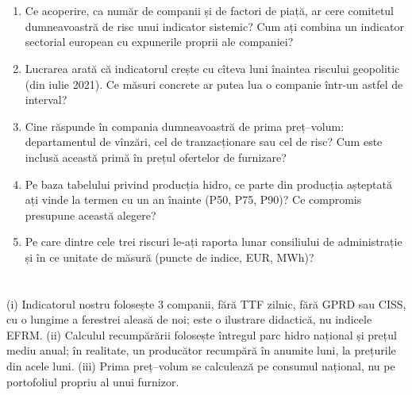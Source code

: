 \section{}
\begin{enumerate}
\item {}%
{Ce acoperire, ca număr de companii și de factori de piață, ar cere comitetul dumneavoastră de risc unui indicator sistemic? Cum ați combina un indicator sectorial european cu expunerile proprii ale companiei?}
\item {}%
{Lucrarea arată că indicatorul crește cu cîteva luni înaintea riscului geopolitic (din iulie 2021). Ce măsuri concrete ar putea lua o companie într-un astfel de interval?}
\item {}%
{Cine răspunde în compania dumneavoastră de prima preț--volum: departamentul de vînzări, cel de tranzacționare sau cel de risc? Cum este inclusă această primă în prețul ofertelor de furnizare?}
\item {}%
{Pe baza tabelului privind producția hidro, ce parte din producția așteptată ați vinde la termen cu un an înainte (P50, P75, P90)? Ce compromis presupune această alegere?}
\item {}%
{Pe care dintre cele trei riscuri le-ați raporta lunar consiliului de administrație și în ce unitate de măsură (puncte de indice, EUR, MWh)?}
\end{enumerate}

\section{}
%
{(i) Indicatorul nostru folosește 3 companii, fără TTF zilnic, fără GPRD sau CISS, cu o lungime a ferestrei aleasă de noi; este o ilustrare didactică, nu indicele EFRM.
(ii) Calculul recumpărării folosește întregul parc hidro național și prețul mediu anual; în realitate, un producător recumpără în anumite luni, la prețurile din acele luni.
(iii) Prima preț--volum se calculează pe consumul național, nu pe portofoliul propriu al unui furnizor.}

